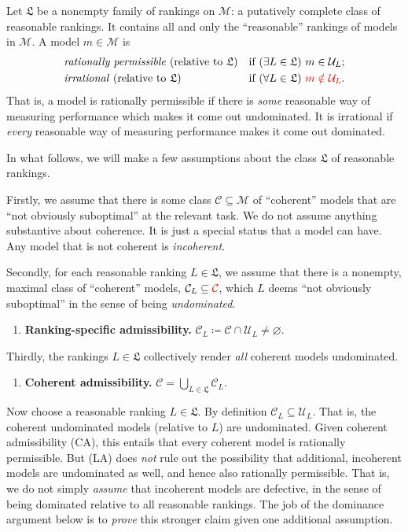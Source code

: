 \documentclass[11pt]{article}
\newcommand{\chg}[1]{{\color{red}#1}}
\theoremstyle{definition}
\theoremstyle{remark}
\newcommand{\M}{\mathcal M}
\newcommand{\C}{\mathcal C}
\newcommand{\U}{\mathcal U}
\newcommand{\Lf}{\mathfrak L}
\begin{document}
Let $\Lf$ be a \chg{nonempty family of rankings on $\M$: a} putatively complete class of reasonable rankings. It contains all and only the ``reasonable'' rankings of models in $\M$. A model $m\in\M$ is
\begin{align*}
&\text{\emph{rationally permissible} (relative to $\Lf$)}&&\text{if }(\exists L\in\Lf)\ m\in\U_L;\\
&\text{\emph{irrational} (relative to $\Lf$)}&&\text{if }(\forall L\in\Lf)\ \chg{m\notin\U_L}.
\end{align*}
That is, a model is rationally permissible if there is \textit{some} reasonable way of measuring performance which makes it come out undominated. It is irrational if \textit{every} reasonable way of measuring performance makes it come out dominated.


In what follows, we will make a few assumptions about the class $\Lf$ of reasonable rankings.

\chg{Firstly}, we assume that there is some class $\C\subseteq\M$ of ``coherent'' models that are ``not obviously suboptimal'' at the relevant task. We do not assume anything substantive about coherence. It is just a special status that a model can have. Any model that is not coherent is \emph{incoherent}. 


\chg{Secondly}, for each reasonable ranking $L\in\mathfrak L$, we assume that there is a nonempty, maximal class of ``coherent'' models, $\C_L\subseteq\chg{\C}$, which $L$ deems ``not obviously suboptimal'' in the sense of being \textit{undominated}.
\begin{enumerate}[label=\textbf{(LA)},leftmargin=*]
\item \textbf{Ranking-specific admissibility.} $\C_L\coloneqq \C\cap\U_L\neq\varnothing$.
\end{enumerate}

\chg{Thirdly}, the rankings $L\in\mathfrak L$ collectively render \textit{all} coherent models undominated.
\begin{enumerate}[label=\textbf{(CA)},leftmargin=*]
\item \textbf{Coherent admissibility.} $\C=\bigcup_{L\in\mathfrak L}\C_L$.
\end{enumerate}

Now choose a reasonable ranking $L\in\mathfrak L$. By definition $\C_L\subseteq\U_L$. That is, the coherent undominated models (relative to $L$) are undominated. Given coherent admissibility (CA), this entails that every coherent model is rationally permissible. But (LA) does \textit{not} rule out the possibility that additional, incoherent models are undominated as well, and hence also rationally permissible. That is, we do not simply \textit{assume} that incoherent models are defective, in the sense of being dominated relative to all reasonable rankings. The job of the dominance argument below is to \textit{prove} this stronger claim given one additional assumption.
\end{document}
